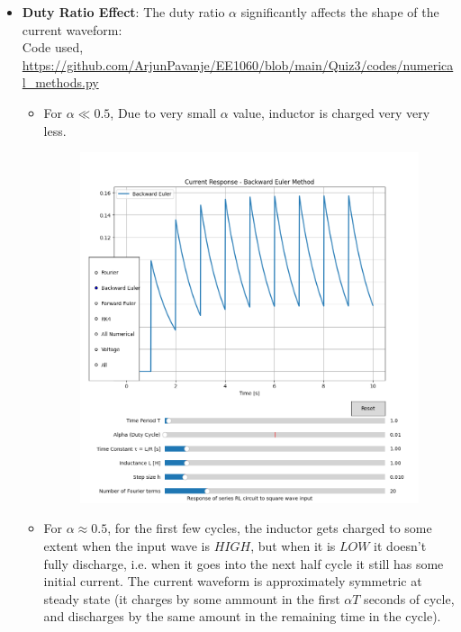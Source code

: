 \documentclass[12pt,a4paper]{report}
\begin{document}
\begin{itemize}
   \item \textbf{Duty Ratio Effect}: The duty ratio $\alpha$ significantly affects the shape of the current waveform:\\
   Code used, \url{https://github.com/ArjunPavanje/EE1060/blob/main/Quiz3/codes/numerical_methods.py}
    \begin{itemize}
        \item For $\alpha \ll 0.5$, Due to very small $\alpha$ value, inductor is charged very very less.
        \begin{figure}[h!]
	\centering
	\includegraphics[scale=0.4]{figs/tau=T-1.png}
        \end{figure}
        \item For $\alpha \approx 0.5$, for the first few cycles, the inductor gets charged to some extent when the input wave is $HIGH$, but when it is $LOW$ it doesn't fully discharge, i.e. when it goes into the next half cycle it still has some initial current. The current waveform is approximately symmetric at steady state (it charges by some ammount in the first $\alpha T$ seconds of cycle, and discharges by the same amount in the remaining time in the cycle).
        \begin{figure}[h!]
	\centering

\end{figure}
\end{itemize}
\end{itemize}
\end{document}

